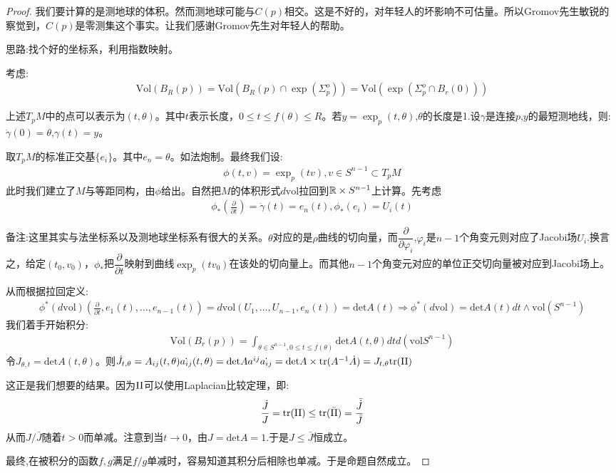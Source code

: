 \begin{proof}
    我们要计算的是测地球的体积。然而测地球可能与$C(p)$相交。这是不好的，对年轻人的坏影响不可估量。所以Gromov先生敏锐的察觉到，$C(p)$是零测集这个事实。让我们感谢Gromov先生对年轻人的帮助。

    思路:找个好的坐标系，利用指数映射。

    考虑:
    \begin{align*}
        \mathrm{Vol}(B_R(p))=\mathrm{Vol}(B_R(p)\cap \exp(\Sigma_p^o))=\mathrm{Vol}(\exp(\Sigma_p^o\cap B_r(0)))
    \end{align*}

    上述$T_pM$中的点可以表示为$(t,\theta)$。其中$t$表示长度，$0 \leq t \leq f(\theta) \leq R$。若$y=\exp_p(t,\theta)$,$\theta$的长度是1.设$\gamma$是连接$p$,$y$的最短测地线，则:$\dot{\gamma}(0)=\theta$,$\gamma(t)=y$。

    取$T_pM$的标准正交基$\{e_i\}$。其中$e_n=\theta$。如法炮制。最终我们设:
    \begin{align*}
        \phi(t,v)=\exp_p(tv),v \in S^{n-1}\subset T_p M
    \end{align*}
    此时我们建立了$M$与等距同构，由$\phi$给出。自然把$M$的体积形式$d\mathrm{vol}$拉回到$\mathbb{R} \times S^{n-1}$上计算。先考虑
    \begin{align*}
        \phi_*(\frac{\partial}{\partial t})=\dot{\gamma}(t)=e_n(t),\phi_*(e_i)=U_i(t)
    \end{align*}

    备注:这里其实与法坐标系以及测地球坐标系有很大的关系。$\theta$对应的是$\rho$曲线的切向量，而$\dfrac{\partial}{\partial \varphi_i}$,$\varphi_i$是$n-1$个角变元则对应了Jacobi场$U_i$.换言之，给定$(t_0,v_0)$，$\phi_*$把$\dfrac{\partial}{\partial t}$映射到曲线$\exp_p(tv_0)$在该处的切向量上。而其他$n-1$个角变元对应的单位正交切向量被对应到Jacobi场上。

    从而根据拉回定义:
    \begin{align*}
        \phi^*(d\mathrm{vol})(\frac{\partial }{\partial t},e_1(t),\dots,e_{n-1}(t))=d\mathrm{vol}(U_1,\dots,U_{n-1},e_n(t))=\mathrm{det}A(t) \Rightarrow  \phi^*(d\mathrm{vol})=\mathrm{det}A(t)dt \wedge \mathrm{vol}(S^{n-1})
    \end{align*}
    我们着手开始积分:
    \begin{align*}
        \mathrm{Vol}(B_r(p))=\int_{\theta \in S^{n-1},0\leq t\leq f(\theta)}\mathrm{det}A(t,\theta)dt d(\mathrm{vol}S^{n-1})
    \end{align*}
    令$J_{\theta,t}=\mathrm{det}A(t,\theta)$。则$\dot{J}_{t,\theta}=A_{ij}(t,\theta)\dot{a_{ij}}(t,\theta)=\mathrm{det}A a^{ij} \dot{a_{ij}}=\mathrm{det}A \times \mathrm{tr}(A^{-1}\dot{A})=J_{t,\theta}\mathrm{tr}(\mathrm{II})$

    这正是我们想要的结果。因为$\mathrm{II}$可以使用Laplacian比较定理，即:
    \begin{align*}
        \frac{\dot{J}}{J}=\mathrm{tr}(\mathrm{II})\leq \mathrm{tr}(\bar{\mathrm{II}})=\frac{\bar{\dot{J}}}{\bar{J}}
    \end{align*}
    从而$J/\bar{J}$随着$t>0$而单减。注意到当$t \to 0$，由$J=\mathrm{det}A=1$.于是$J\leq \bar{J}$恒成立。

    最终,在被积分的函数$f,g$满足$f/g$单减时，容易知道其积分后相除也单减。于是命题自然成立。
\end{proof}
